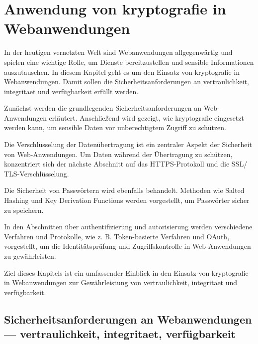 \newpage
\section[Anwendung von Kryptografie in Webanwendungen]{Anwendung von \gls{kryptografie} in Webanwendungen}\label{sec:anwendung_von_kryptografie_in_webanwendungen}
In der heutigen vernetzten Welt sind Webanwendungen allgegenwärtig und spielen eine wichtige Rolle, um Dienste bereitzustellen und sensible Informationen auszutauschen. In diesem Kapitel geht es um den Einsatz von \gls{kryptografie} in Webanwendungen. Damit sollen die Sicherheitsanforderungen an \gls{vertraulichkeit}, \gls{integritaet} und \gls{verfügbarkeit} erfüllt werden.

Zunächst werden die grundlegenden Sicherheitsanforderungen an Web-Anwendungen erläutert. Anschließend wird gezeigt, wie \gls{kryptografie} eingesetzt werden kann, um sensible Daten vor unberechtigtem Zugriff zu schützen.

Die Verschlüsselung der Datenübertragung ist ein zentraler Aspekt der Sicherheit von Web-Anwendungen. Um Daten während der Übertragung zu schützen, konzentriert sich der nächste Abschnitt auf das \ac{HTTPS}-Protokoll und die \ac{SSL}/ \acf{TLS}-Verschlüsselung.

Die Sicherheit von Passwörtern wird ebenfalls behandelt. Methoden wie Salted Hashing und Key Derivation Functions werden vorgestellt, um Passwörter sicher zu speichern.

In den Abschnitten über \gls{authentifizierung} und \gls{autorisierung} werden verschiedene Verfahren und Protokolle, wie z. B. Token-basierte Verfahren und OAuth, vorgestellt, um die Identitätsprüfung und Zugriffskontrolle in Web-Anwendungen zu gewährleisten.

Ziel dieses Kapitels ist ein umfassender Einblick in den Einsatz von \gls{kryptografie} in Webanwendungen zur Gewährleistung von \gls{vertraulichkeit}, \gls{integritaet} und \gls{verfügbarkeit}.

\subsection[Sicherheitsanforderungen an Webanwendungen]{Sicherheitsanforderungen an Webanwendungen — \gls{vertraulichkeit}, \gls{integritaet}, \gls{verfügbarkeit}}

